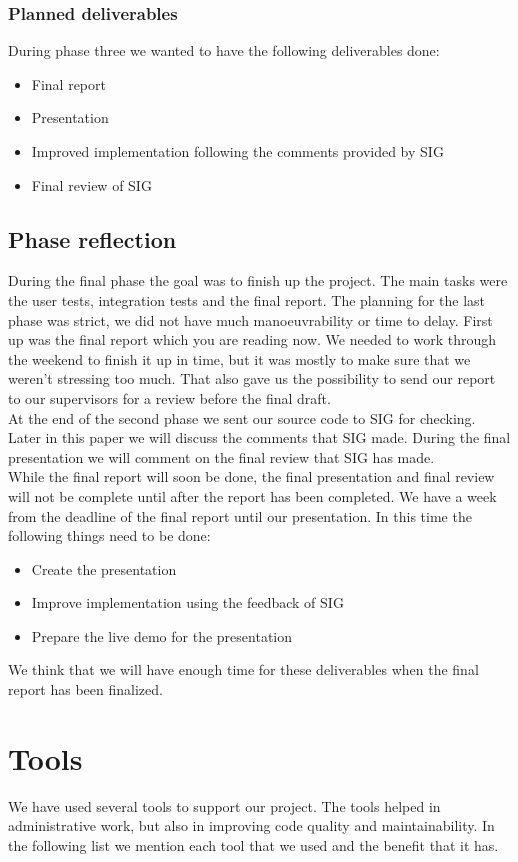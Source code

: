 \subsubsection{Planned deliverables}
During phase three we wanted to have the following deliverables done:
\begin{itemize}
\item Final report
\item Presentation
\item Improved implementation following the comments provided by SIG
\item Final review of SIG
\end{itemize}

\subsection{Phase reflection}
During the final phase the goal was to finish up the project.
The main tasks were the user tests, integration tests and the final report.
The planning for the last phase was strict, we did not have much manoeuvrability or time to delay.
First up was the final report which you are reading now.
We needed to work through the weekend to finish it up in time, but it was mostly to make sure that we weren't stressing too much.
That also gave us the possibility to send our report to our supervisors for a review before the final draft.\\
At the end of the second phase we sent our source code to SIG for checking.
Later in this paper we will discuss the comments that SIG made.
During the final presentation we will comment on the final review that SIG has made.\\
While the final report will soon be done, the final presentation and final review will not be complete until after the report has been completed.
We have a week from the deadline of the final report until our presentation.
In this time the following things need to be done:
\begin{itemize}
\item Create the presentation
\item Improve implementation using the feedback of SIG
\item Prepare the live demo for the presentation
\end{itemize}
We think that we will have enough time for these deliverables when the final report has been finalized.

\section{Tools}
We have used several tools to support our project.
The tools helped in administrative work, but also in improving code quality and maintainability.
In the following list we mention each tool that we used and the benefit that it has.

